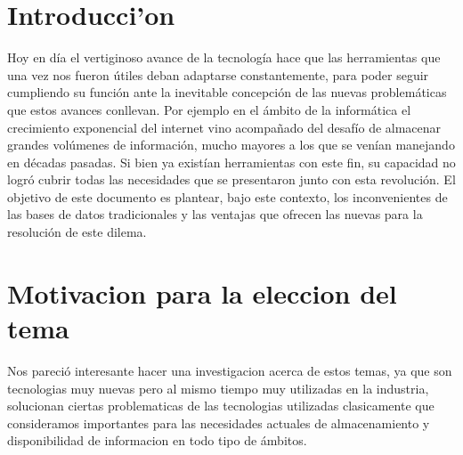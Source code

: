 \documentclass[11pt,a4paper]{article}
\begin{document}
\newpage
\thispagestyle{empty}
\tableofcontents

\parskip=5pt
\setlength{\parindent}{0pt}

\newpage
\setcounter{page}{1}
\pagestyle{plain}

\section{Introducci'on}
Hoy en día el vertiginoso avance de la tecnología hace que las herramientas que una vez nos fueron útiles deban adaptarse constantemente, para poder seguir cumpliendo su función ante la inevitable concepción de las nuevas problemáticas que estos avances conllevan. Por ejemplo en el ámbito de la informática el crecimiento exponencial del internet vino acompañado del desafío de almacenar grandes volúmenes de información, mucho mayores a los que se venían manejando en décadas pasadas. Si bien ya existían herramientas con este fin, su capacidad no logró cubrir todas las necesidades que se presentaron junto con esta revolución. El objetivo de este documento es plantear, bajo este contexto, los inconvenientes de las bases de datos tradicionales y las ventajas que ofrecen las nuevas para la resolución de este dilema.	

\section{Motivacion para la eleccion del tema}
Nos pareci\'o interesante hacer una investigacion acerca de estos temas, ya que son tecnologias muy nuevas pero al mismo tiempo muy utilizadas en la industria, solucionan ciertas problematicas de las tecnologias utilizadas clasicamente que consideramos importantes para las necesidades actuales de almacenamiento y disponibilidad de informacion en todo tipo de \'ambitos. 
\end{document}
